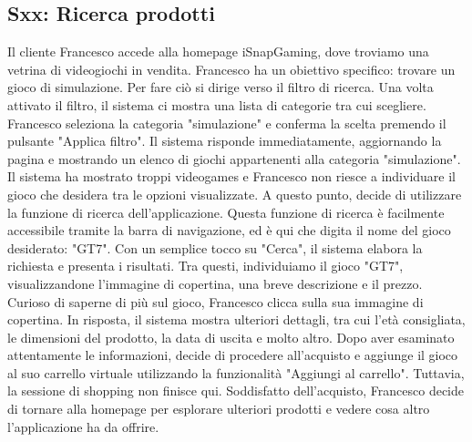 \documentclass[12pt, a4paper, oneside]{book}
\begin{document}
    \subsection*{Sxx: Ricerca prodotti}
        Il cliente Francesco accede alla homepage iSnapGaming, dove troviamo una vetrina di videogiochi in vendita.
        Francesco ha un obiettivo specifico: trovare un gioco di simulazione. Per fare ciò si dirige verso il filtro di
        ricerca. Una volta attivato il filtro, il sistema ci mostra una lista di categorie tra cui scegliere. Francesco
        seleziona la categoria "simulazione" e conferma la scelta premendo il pulsante "Applica filtro". Il sistema risponde
        immediatamente, aggiornando la pagina e mostrando un elenco di giochi appartenenti alla categoria "simulazione".
        Il sistema ha mostrato troppi videogames e Francesco non riesce a individuare il gioco che desidera tra le opzioni
        visualizzate. A questo punto, decide di utilizzare la funzione di ricerca dell'applicazione. Questa funzione di
        ricerca è facilmente accessibile tramite la barra di navigazione, ed è qui che digita il nome del gioco
        desiderato: "GT7". Con un semplice tocco su "Cerca", il sistema elabora la richiesta e presenta i risultati.
        Tra questi, individuiamo il gioco "GT7", visualizzandone l'immagine di copertina, una breve descrizione e il prezzo.
        Curioso di saperne di più sul gioco, Francesco clicca sulla sua immagine di copertina. In risposta, il sistema
        mostra ulteriori dettagli, tra cui l'età consigliata, le dimensioni del prodotto, la data di uscita e molto altro.
        Dopo aver esaminato attentamente le informazioni, decide di procedere all'acquisto e aggiunge il gioco al suo
        carrello virtuale utilizzando la funzionalità  "Aggiungi al carrello". Tuttavia, la sessione di shopping non finisce
        qui. Soddisfatto dell'acquisto, Francesco decide di tornare alla homepage per esplorare ulteriori prodotti e vedere
        cosa altro l'applicazione ha da offrire.
\end{document}
